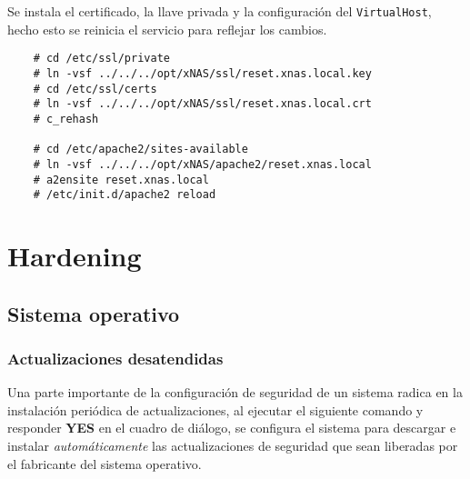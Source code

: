 Se instala el certificado, la llave privada y la configuraci\'{o}n del \texttt{VirtualHost}, hecho esto se reinicia el servicio para reflejar los cambios.

{
\scriptsize
\linespread{1}
\begin{verbatim}
    # cd /etc/ssl/private
    # ln -vsf ../../../opt/xNAS/ssl/reset.xnas.local.key
    # cd /etc/ssl/certs
    # ln -vsf ../../../opt/xNAS/ssl/reset.xnas.local.crt
    # c_rehash

    # cd /etc/apache2/sites-available
    # ln -vsf ../../../opt/xNAS/apache2/reset.xnas.local
    # a2ensite reset.xnas.local
    # /etc/init.d/apache2 reload
\end{verbatim}
}

    \section {Hardening}

      \subsection {Sistema operativo}

        \subsubsection {Actualizaciones desatendidas}

Una parte importante de la configuraci\'{o}n de seguridad de un sistema radica en la instalaci\'{o}n peri\'{o}dica de actualizaciones, al ejecutar el siguiente comando y responder \textbf{YES} en el cuadro de di\'{a}logo, se configura el sistema para descargar e instalar \emph{autom\'{a}ticamente} las actualizaciones de seguridad que sean liberadas por el fabricante del sistema operativo.

%


